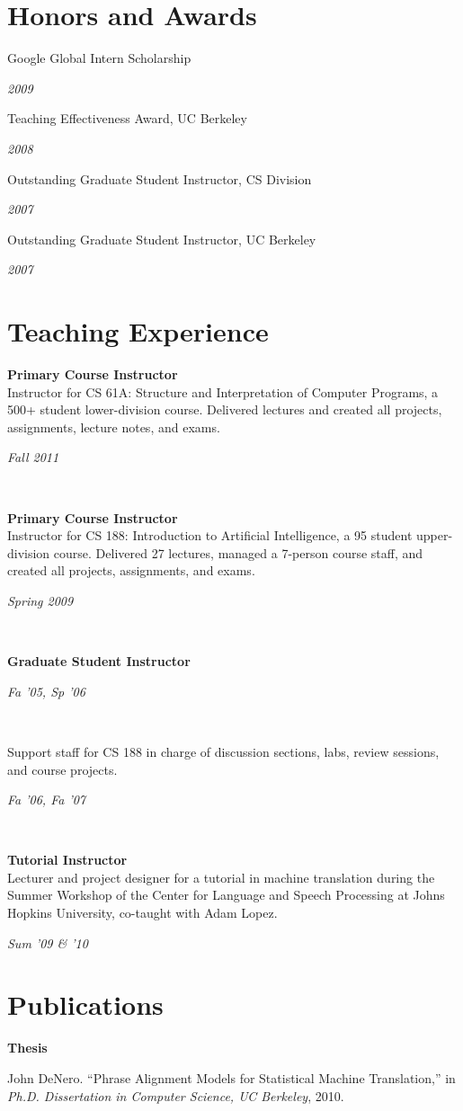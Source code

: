 \documentclass[margin,line]{res}
\newcommand{\dated}[2]{\parbox[t]{4.4in}{#1} \hspace{0.4in}
											 \parbox[t]{1in}{ {\it #2 } } }
\begin{document}
\begin{resume}
\section{\sc Honors and Awards}
\dated{Google Global Intern Scholarship} { 2009 }

\dated{Teaching Effectiveness Award, UC Berkeley} { 2008 }

\dated{Outstanding Graduate Student Instructor, CS Division} { 2007 }

\dated{Outstanding Graduate Student Instructor, UC Berkeley} { 2007 }

\section{\sc Teaching Experience}
\dated{ {\bf Primary Course Instructor}\\
Instructor for CS 61A: Structure and Interpretation of Computer Programs, a
500+ student lower-division course. Delivered lectures and created all projects,
assignments, lecture notes, and exams.} {Fall 2011} \\

\dated{ {\bf Primary Course Instructor}\\
Instructor for CS 188: Introduction to Artificial Intelligence, a 95 student
upper-division course. Delivered 27 lectures, managed a 7-person course staff,
and created all projects, assignments, and exams.} {Spring 2009} \\

\dated{ {\bf Graduate Student Instructor}}{Fa '05, Sp '06}\\
\dated{ Support staff for CS 188 in charge of discussion sections, labs, review
sessions, and course projects.}
{Fa '06, Fa '07} \\

\dated{ {\bf Tutorial Instructor }\\
Lecturer and project designer for a tutorial in machine translation during the
Summer Workshop of the Center for Language and Speech Processing at Johns
Hopkins University, co-taught with Adam Lopez. }
{Sum '09 \& '10}

\newpage

\section{\sc Publications}

{\bf Thesis }

John DeNero. ``Phrase Alignment Models for Statistical Machine Translation,'' in {\it Ph.D. Dissertation in Computer Science, UC Berkeley}, 2010.


\end{resume}
\end{document}
